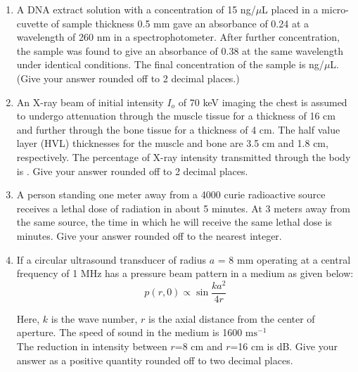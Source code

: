 \documentclass[a4paper,12pt]{exam}
\numberwithin{equation}{enumi}
\numberwithin{figure}{enumi}
\begin{document}
\begin{enumerate}
\hfill{}

\item A DNA extract solution with a concentration of 15 ng/$\mu$L placed in a micro-cuvette of sample thickness 0.5 mm gave an absorbance of 0.24 at a wavelength of 260 nm in a 
spectrophotometer. After further concentration, the sample was found to give an absorbance of 0.38 at the same wavelength under identical conditions. The final 
concentration of the sample is \underline{\hspace{1cm}} ng/$\mu$L. (Give your answer rounded off to 2 
decimal places.)

\hfill{}

\item An X-ray beam of initial intensity $I_o$ of 70 keV imaging the chest is assumed to undergo 
attenuation through the muscle tissue for a thickness of 16 cm and further through the 
bone tissue for a thickness of 4 cm. The half value layer (HVL) thicknesses for the 
muscle and bone are 3.5 cm and 1.8 cm, respectively. The percentage of X-ray 
intensity transmitted through the body is \underline{\hspace{1cm}}. Give your answer rounded off to 2 
decimal places.

\hfill{}

\item A person standing one meter away from a 4000 curie radioactive source receives a  
lethal dose of radiation in about 5 minutes. At 3 meters away from the same source, 
the time in which he will receive the same lethal dose is \underline{\hspace{1cm}}minutes. Give your 
answer rounded off to the nearest integer.

\hfill{}

\item If a circular ultrasound transducer of radius $a$ = 8 mm operating at a central frequency 
of 1 MHz has a pressure beam pattern in a medium as given below: \\[8pt]
\begin{equation*} p(r, 0)\propto \sin \frac{ka^2}{4r}
\end{equation*}

Here, $k$ is the wave number, $r$ is the axial distance from the center of aperture. The 
speed of sound in the medium is 1600 m$\text{s}^{-1}$ \\[8pt] The reduction in intensity between $r$=8 cm and $r$=16 cm is \underline{\hspace{1cm}} dB. Give your  
answer as a positive quantity rounded off to two decimal places.


\end{enumerate}
\end{document}
